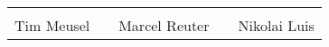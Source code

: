 \vspace{10ex}
{\centering
\renewcommand{\arraystretch}{0.9}
\begin{tabular}{p{}p{}p{}p{}p{}}
  \dotfill                    & & \dotfill                      & & \dotfill \\
  \centering\footnotesize{Tim Meusel}& & \centering\footnotesize{Marcel Reuter}& & \centering\footnotesize{Nikolai Luis}%
\end{tabular}
}

